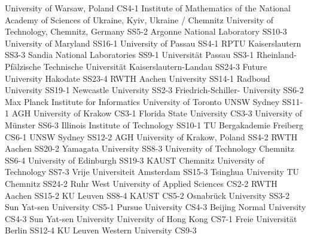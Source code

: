 \begin{multicols}{2}
{ University of Warsaw, Poland }
{CS4-1}
{}
{ Institute of Mathematics of the National Academy of Sciences of Ukraine,  Kyiv, Ukraine / Chemnitz University of Technology, Chemnitz, Germany }
{SS5-2}
{}
{ Argonne National Laboratory }
{SS10-3}
{}
{ University of Maryland }
{SS16-1}
{}
{ University of Passau }
{SS4-1}
{}
{ RPTU Kaiserslautern }
{SS3-3}
{}
{ Sandia National Laboratories }
{SS9-1}
{}
{ Universität Passau }
{SS3-1}
{}
{ Rheinland-Pfälzische Technische Universität Kaiserslautern-Landau }
{SS24-3}
{}
{ Future University Hakodate }
{SS23-4}
{}
{ RWTH Aachen University }
{SS14-1}
{}
{ Radboud University }
{SS19-1}
{}
{ Newcastle University }
{SS2-3}
{}
{ Friedrich-Schiller- University }
{SS6-2}
{}
{ Max Planck Institute for Informatics }
{}
{}
{ University of Toronto }
{}
{}
{ UNSW Sydney }
{SS11-1}
{}
{ AGH University of Krakow }
{CS3-1}
{}
{ Florida State University }
{CS3-3}
{}
{ University of Münster }
{SS6-3}
{}
{ Illinois Institute of Technology }
{SS10-1}
{}
{ TU Bergakademie Freiberg }
{CS6-1}
{}
{ UNSW Sydney }
{SS12-2}
{}
{ AGH University of Krakow, Poland }
{SS4-2}
{}
{ RWTH Aachen }
{SS20-2}
{}
{ Yamagata University }
{SS8-3}
{}
{ University of Technology Chemnitz }
{SS6-4}
{}
{ University of Edinburgh }
{SS19-3}
{}
{ KAUST }
{}
{}
{ Chemnitz University of Technology }
{SS7-3}
{}
{ Vrije Universiteit Amsterdam }
{SS15-3}
{}
{ Tsinghua University }
{}
{}
{ TU Chemnitz }
{SS24-2}
{}
{ Ruhr West University of Applied Sciences }
{CS2-2}
{}
{ RWTH Aachen }
{SS15-2}
{}
{ KU Leuven }
{SS8-4}
{}
{ KAUST }
{CS5-2}
{}
{ Osnabrück University }
{SS3-2}
{}
{ Sun Yat-sen University }
{CS5-1}
{}
{ Pursue University }
{CS4-3}
{}
{ Beijing Normal University }
{CS4-3}
{}
{ Sun Yat-sen University }
{}
{}
{ University of Hong Kong }
{CS7-1}
{}
{ Freie Universität Berlin }
{SS12-4}
{}
{ KU Leuven }
{}
{}
{ Western University }
{CS9-3}
{}

\end{multicols}

